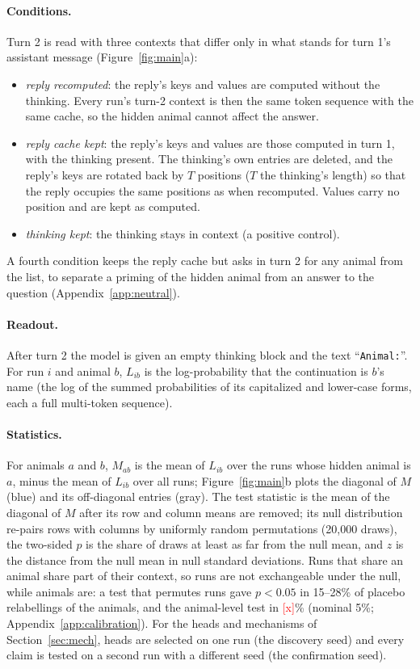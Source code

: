 \documentclass[11pt]{article}
\newcommand{\pending}[1]{\textcolor{red}{[#1]}}
\begin{document}
\paragraph{Conditions.} Turn 2 is read with three contexts that differ only in what stands for turn 1's assistant
message (Figure~\ref{fig:main}a):
\begin{itemize}
\item \emph{reply recomputed}: the reply's keys and values are computed without the thinking. Every run's turn-2
context is then the same token sequence with the same cache, so the hidden animal cannot affect the answer.
\item \emph{reply cache kept}: the reply's keys and values are those computed in turn 1, with the thinking present. The
thinking's own entries are deleted, and the reply's keys are rotated back by $T$ positions ($T$ the thinking's length)
so that the reply occupies the same positions as when recomputed. Values carry no position and are kept as computed.
\item \emph{thinking kept}: the thinking stays in context (a positive control).
\end{itemize}
A fourth condition keeps the reply cache but asks in turn 2 for any animal from the list, to separate a priming of the
hidden animal from an answer to the question (Appendix~\ref{app:neutral}).

\paragraph{Readout.} After turn 2 the model is given an empty thinking block and the text ``\texttt{Animal:}''. For
run $i$ and animal $b$, $L_{ib}$ is the log-probability that the continuation is $b$'s name (the log of the summed
probabilities of its capitalized and lower-case forms, each a full multi-token sequence).

\paragraph{Statistics.} For animals $a$ and $b$, $M_{ab}$ is the mean of $L_{ib}$ over the runs whose hidden animal is
$a$, minus the mean of $L_{ib}$ over all runs; Figure~\ref{fig:main}b plots the diagonal of $M$ (blue) and its
off-diagonal entries (gray). The test statistic is the mean of the diagonal of $M$ after its row and column means are
removed; its null distribution re-pairs rows with columns by uniformly random permutations (20{,}000 draws), the
two-sided $p$ is the share of draws at least as far from the null mean, and $z$ is the distance from the null mean in
null standard deviations. Runs that share an animal share part of their context, so runs are not exchangeable under
the null, while animals are: a test that permutes runs gave $p<0.05$ in 15--28\% of placebo relabellings of the
animals, and the animal-level test in \pending{x}\% (nominal 5\%; Appendix~\ref{app:calibration}). For the heads and
mechanisms of Section~\ref{sec:mech}, heads are selected on one run (the discovery seed) and every claim is tested on a
second run with a different seed (the confirmation seed).
\end{document}
